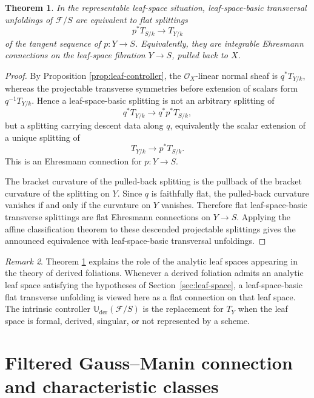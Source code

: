 \documentclass[11pt,reqno,a4paper,dvipsnames,x11names]{amsart}
\numberwithin{equation}{section}
\theoremstyle{plain}
\newtheorem{theorem}{Theorem}[section]
\theoremstyle{definition}
\theoremstyle{remark}
\newtheorem{remark}[theorem]{Remark}
\newcommand{\cO}{\mathcal{O}}
\newcommand{\kk}{k}
\newcommand{\cF}{\mathcal F}
\newcommand{\Uder}{\mathbb U_{\mathrm{der}}}
\newcommand{\from}{\colon}
\begin{document}
\begin{theorem}\label{thm:leaf-space-connection}
In the representable leaf-space situation, leaf-space-basic transversal unfoldings of \(\cF/S\) are equivalent to flat splittings
\[
 p^*T_{S/\kk}\longrightarrow T_{Y/\kk}
\]
of the tangent sequence of \(p\from Y\to S\). Equivalently, they are integrable Ehresmann connections on the leaf-space fibration \(Y\to S\), pulled back to \(X\).
\end{theorem}

\begin{proof}
By Proposition \ref{prop:leaf-controller}, the \(\cO_X\)-linear normal sheaf is \(q^*T_{Y/\kk}\), whereas the projectable transverse symmetries before extension of scalars form \(q^{-1}T_{Y/\kk}\). Hence a leaf-space-basic splitting is not an arbitrary splitting of
\[
 q^*T_{Y/\kk}\longrightarrow q^*p^*T_{S/\kk},
\]
but a splitting carrying descent data along \(q\), equivalently the scalar extension of a unique splitting of
\[
 T_{Y/\kk}\longrightarrow p^*T_{S/\kk}.
\]
This is an Ehresmann connection for \(p\from Y\to S\).

The bracket curvature of the pulled-back splitting is the pullback of the bracket curvature of the splitting on \(Y\). Since \(q\) is faithfully flat, the pulled-back curvature vanishes if and only if the curvature on \(Y\) vanishes. Therefore flat leaf-space-basic transverse splittings are flat Ehresmann connections on \(Y\to S\). Applying the affine classification theorem to these descended projectable splittings gives the announced equivalence with leaf-space-basic transversal unfoldings.
\end{proof}

\begin{remark}
Theorem \ref{thm:leaf-space-connection} explains the role of the analytic leaf spaces appearing in the theory of derived foliations. Whenever a derived foliation admits an analytic leaf space satisfying the hypotheses of Section~\ref{sec:leaf-space}, a leaf-space-basic flat transverse unfolding is viewed here as a flat connection on that leaf space. The intrinsic controller \(\Uder(\cF/S)\) is the replacement for \(T_Y\) when the leaf space is formal, derived, singular, or not represented by a scheme.
\end{remark}



\section{Filtered Gauss--Manin connection and characteristic classes}\label{sec:filtered-GM}
\end{document}
